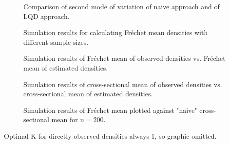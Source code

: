 \begin{figure}[h]
    \centering
    \resizebox{0.9\textwidth}{!}{}
    \caption[Comparison: second mode of variation]{Comparison of second mode of variation
    of naive approach and of LQD approach.}
    \label{fig:2nd_modes}
\end{figure}

\begin{figure}[h]
    \centering
    \resizebox{0.9\textwidth}{!}{}
    \caption[Simulation results: average Fréchet means]{Simulation results for calculating
    Fréchet mean densities with different sample sizes.}
    \label{fig:sim_f_mean}
\end{figure}

\begin{figure}[h]
    \centering
    
    \caption[Simulation results: observed vs estimated densities --- Fréchet mean]{Simulation
    results of Fréchet mean of observed densities vs. Fréchet mean of estimated densities.}
    \label{fig:sim_f_denstimation}
\end{figure}

\begin{figure}[h]
    \centering
    \resizebox{0.9\textwidth}{!}{}
    \caption[Simulation results: observed vs estimated densities --- cross-sectional mean]{Simulation
    results of cross-sectional mean of observed densities vs. cross-sectional mean of
    estimated densities.}
    \label{fig:sim_cs_denstimation}
\end{figure}

\begin{figure}[h]
    \centering
    \resizebox{0.9\textwidth}{!}{}
    \caption[Simulation results: Fréchet mean vs cross-sectional mean]{Simulation
    results of Fréchet mean plotted against "naive" cross-sectional mean for $n = 200$.}
    \label{fig:sim_f_vs_cs}
\end{figure}

Optimal K for directly observed densities always 1, so graphic omitted.

